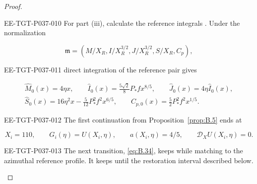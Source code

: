 \begin{proof}
\begin{EESegment}{EE-TGT-P037-010}
For part (iii), calculate the reference integrals
. Under the normalization
\end{EESegment}
\[
\widehat{\mathfrak m}=(M/X_R,I/X_R^{3/2},J/X_R^{3/2},S/X_R,C_p),
\]
\begin{EESegment}{EE-TGT-P037-011}
direct integration of the reference pair gives
\end{EESegment}
\begin{equation}
\begin{gathered}
\widehat M_0(x)=4\eta x,\qquad
\widehat I_0(x)=\frac{5\sqrt2}{8}P_*f x^{8/5},\qquad
\widehat J_0(x)=4\eta\widehat I_0(x),\\
\widehat S_0(x)=16\eta^2x-\frac5{12}P_*^2f^2x^{6/5},\qquad
C_{p,0}(x)=\frac52P_*^2f^2x^{1/5}.
\end{gathered}
\tag{4.34}\label{eq:4.34}
\end{equation}
\begin{EESegment}{EE-TGT-P037-012}
The first continuation from Proposition~\ref{prop:B.5} ends at
\end{EESegment}
\[
X_i=110,\qquad G_i(\eta)=U(X_i,\eta),\qquad
a(X_i,\eta)=4/5,\qquad \mathcal D_XU(X_i,\eta)=0.
\]
\begin{EESegment}{EE-TGT-P037-013}
The next transition, \eqref{eq:B.34}, keeps
 while matching
 to the azimuthal reference profile. It keeps
 until the restoration interval described below.
\end{EESegment}


\end{proof}
